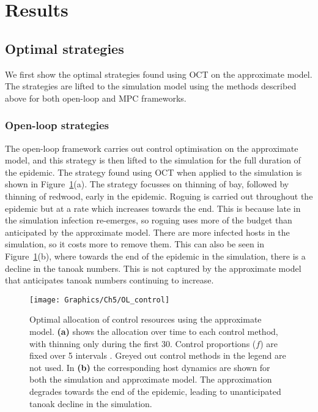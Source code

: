 \section{Results\label{sec:ch5:results}}

\subsection{Optimal strategies}

We first show the optimal strategies found using OCT on the approximate model. The strategies are lifted to the simulation model using the methods described above for both open-loop and MPC frameworks.

\subsubsection{Open-loop strategies}

The open-loop framework carries out control optimisation on the approximate model, and this strategy is then lifted to the simulation for the full duration of the epidemic. The strategy found using OCT when applied to the simulation is shown in Figure~\ref{fig:ch5:ol_strat}(a). The strategy focusses on thinning of bay, followed by thinning of redwood, early in the epidemic. Roguing is carried out throughout the epidemic but at a rate which increases towards the end. This is because late in the simulation infection re-emerges, so roguing uses more of the budget than anticipated by the approximate model. There are more infected hosts in the simulation, so it costs more to remove them. This can also be seen in Figure~\ref{fig:ch5:ol_strat}(b), where towards the end of the epidemic in the simulation, there is a decline in the tanoak numbers. This is not captured by the approximate model that anticipates tanoak numbers continuing to increase.

\begin{figure}[!t]
    \begin{center}
        \texttt{[image: Graphics/Ch5/OL\_control]}
        \caption[Open-loop control strategy]{Optimal allocation of control resources using the approximate model. \textbf{(a)} shows the allocation over time to each control method, with thinning only during the first \SI{30}{\years{}}. Control proportions ($f$) are fixed over \SI{5}{\year} intervals . Greyed out control methods in the legend are not used. In \textbf{(b)} the corresponding host dynamics are shown for both the simulation and approximate model. The approximation degrades towards the end of the epidemic, leading to unanticipated tanoak decline in the simulation. \label{fig:ch5:ol_strat}}
    \end{center}
\end{figure}

